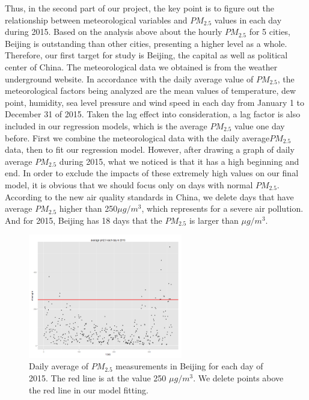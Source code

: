 \documentclass[11pt]{article} %
\begin{document}
 Thus, in the second part of our project, the key point is to figure out the relationship between meteorological variables and \(PM_{2.5}\) values in each day during 2015. 
Based on the analysis above about the hourly \(PM_{2.5}\) for 5 cities, Beijing is outstanding than other cities, presenting a higher level as a whole. Therefore, our first target for study is Beijing, the capital as well as political center of China. 
The meteorological data we obtained is from the weather underground website. In accordance with the daily average value of \(PM_{2.5}\), the meteorological factors being analyzed are the mean values of temperature, dew point, humidity, sea level pressure and wind speed in each day from January 1 to December 31 of 2015. Taken the lag effect into consideration, a lag factor is also included in our regression models, which is the average \(PM_{2.5}\) value one day before.
First we combine the meteorological data with the daily average\(PM_{2.5}\) data, then to fit our regression model. However, after drawing a graph of daily average \(PM_{2.5}\) during 2015, what we noticed is that it has a high beginning and end. In order to exclude the impacts of these extremely high values on our final model, it is obvious that we should focus only on days with normal \(PM_{2.5}\). According to the new air quality standards in China, we delete days that have average \(PM_{2.5}\) higher than 250\(\mu g/m^3\), which represents for a severe air pollution. And for 2015, Beijing has 18 days that the \(PM_{2.5}\) is larger than \(\mu g/m^3\).

 \begin{figure}[!ht]
  \centering
    \includegraphics[width=0.6\textwidth]{Figure2-1}
      \caption{Daily average of \(PM_{2.5}\) measurements in Beijing for each day of 2015. The red line is at the value 250 \(\mu g / m^3\). We delete points above the red line in our model fitting.}
\end{figure}
 
\end{document}
